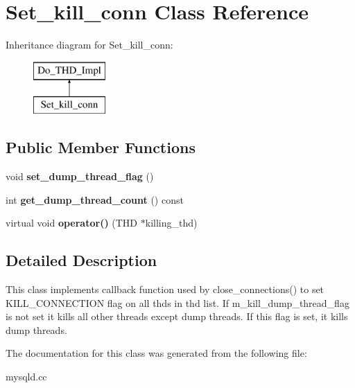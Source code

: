 \hypertarget{classSet__kill__conn}{}\section{Set\+\_\+kill\+\_\+conn Class Reference}
\label{classSet__kill__conn}
Inheritance diagram for Set\+\_\+kill\+\_\+conn\+:\begin{figure}[H]
\begin{center}
\leavevmode
\includegraphics[height=2.000000cm]{classSet__kill__conn}
\end{center}
\end{figure}
\subsection*{Public Member Functions}
\begin{DoxyCompactItemize}
\item 
\mbox{\label{classSet__kill__conn_a7c3e441119db857ba4e5ca98416ad3fd}} 
void {\bfseries set\+\_\+dump\+\_\+thread\+\_\+flag} ()
\item 
\mbox{\label{classSet__kill__conn_a0bf0fd58a77df7126d31bf4ae82a7e99}} 
int {\bfseries get\+\_\+dump\+\_\+thread\+\_\+count} () const
\item 
\mbox{\label{classSet__kill__conn_adf8895e794959003e2a463ac89951170}} 
virtual void {\bfseries operator()} (T\+HD $\ast$killing\+\_\+thd)
\end{DoxyCompactItemize}


\subsection{Detailed Description}
This class implements callback function used by close\+\_\+connections() to set K\+I\+L\+L\+\_\+\+C\+O\+N\+N\+E\+C\+T\+I\+ON flag on all thds in thd list. If m\+\_\+kill\+\_\+dump\+\_\+thread\+\_\+flag is not set it kills all other threads except dump threads. If this flag is set, it kills dump threads. 

The documentation for this class was generated from the following file\+:\begin{DoxyCompactItemize}
\item 
mysqld.\+cc\end{DoxyCompactItemize}
